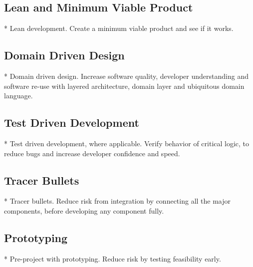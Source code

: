 \subsection{Lean and Minimum Viable Product}

* Lean development. Create a minimum viable product and see if it works.

\subsection{Domain Driven Design}

* Domain driven design. Increase software quality, developer understanding and software re-use with layered architecture, domain layer and ubiquitous domain language.

\subsection{Test Driven Development}

* Test driven development, where applicable. Verify behavior of critical logic, to reduce bugs and increase developer confidence and speed.

\subsection{Tracer Bullets}
* Tracer bullets. Reduce risk from integration by connecting all the major components, before developing any component fully.

\subsection{Prototyping}

* Pre-project with prototyping. Reduce risk by testing feasibility early.

